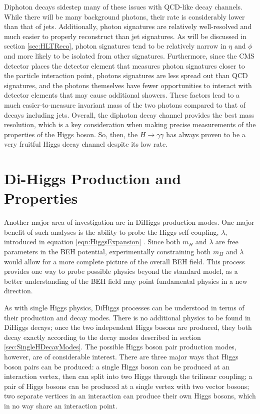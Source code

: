 \documentclass[12pt]{ucsddissertation}
\begin{document}
Diphoton decays sidestep many of these issues with QCD-like decay channels. While there will be many background photons, their rate is considerably lower than that of jets. Additionally, photon signatures are relatively well-resolved and much easier to properly reconstruct than jet signatures. As will be discussed in section \ref{sec:HLTReco}, photon signatures tend to be relatively narrow in $\eta$ and $\phi$ and more likely to be isolated from other signatures. Furthermore, since the CMS detector places the detector element that measures photon signatures closer to the particle interaction point, photons signatures are less spread out than QCD signatures, and the photons themselves have fewer opportunities to interact with detector elements that may cause additional showers. These factors lead to a much easier-to-measure invariant mass of the two photons compared to that of decays including jets. Overall, the diphoton decay channel provides the best mass resolution, which is a key consideration when making precise measurements of the properties of the Higgs boson. So, then, the $H \rightarrow \gamma \gamma$ has always proven to be a very fruitful Higgs decay channel despite its low rate.

\section{Di-Higgs Production and Properties}
Another major area of investigation are in DiHiggs production modes. One major benefit of such analyses is the ability to probe the Higgs self-coupling, $\lambda$, introduced in equation \ref{eqn:HiggsExpansion} \cite{CMS10YearReview}. Since both $m_H$ and $\lambda$ are free parameters in the BEH potential, experimentally constraining both $m_H$ and $\lambda$ would allow for a more complete picture of the overall BEH field. This process provides one way to probe possible physics beyond the standard model, as a better understanding of the BEH field may point fundamental physics in a new direction.

As with single Higgs physics, DiHiggs processes can be understood in terms of their production and decay modes. There is no additional physics to be found in DiHiggs decays; once the two independent Higgs bosons are produced, they both decay exactly according to the decay modes described in section \ref{sec:SingleHDecayModes}. The possible Higgs boson pair production modes, however, are of considerable interest. There are three major ways that Higgs boson pairs can be produced: a single Higgs boson can be produced at an interaction vertex, then can split into two Higgs through the trilinear coupling; a pair of Higgs bosons can be produced at a single vertex with two vector bosons; two separate vertices in an interaction can produce their own Higgs bosons, which in no way share an interaction point.
\end{document}
